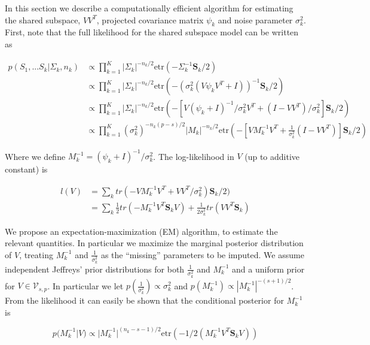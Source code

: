 \documentclass{article}
\newcommand{\etr}{\text{etr}}
\begin{document}
In this section we describe a computationally efficient algorithm for
estimating the shared subspace, $VV^T$, projected covariance matrix
$\psi_k$ and noise parameter $\sigma_k^2$.  First, note that the full
likelihood for the shared subspace model can be written as

\begin{align}
p(S_1, ... S_k | \Sigma_k,n_k) &\propto \prod_{k=1}^K |\Sigma_k|^{-n_k/2}\etr(-\Sigma_k^{-1}\mathbf{S}_k/2)  \\
&\propto \prod_{k=1}^K  |\Sigma_k|^{-n_k/2}\etr(-(\sigma_k^2(V\psi_kV^T +
  I))^{-1}\mathbf{S}_k/2) \\
&\propto \prod_{k=1}^K  |\Sigma_k|^{-n_k/2}\etr(-\left[V(\psi_k +
  I)^{-1}/\sigma_k^2 V^T + (I-VV^T)/\sigma^2_k\right]\mathbf{S}_k/2)
  \\
&\propto \prod_{k=1}^K  (\sigma_k^2)^{-n_k(p-s)/2}|M_k|^{-n_k/2}\etr(-\left[VM_k^{-1}V^T + \frac{1}{\sigma^2_k} (I-VV^T)\right]\mathbf{S}_k/2) 
\end{align}

Where we define $M_k^{-1} = (\psi_k + I) ^{-1}/\sigma_k^2$.  The log-likelihood in
$V$ (up to additive constant) is

\begin{align}
l(V) &= \sum_k tr\left(-VM_k^{-1}V^T +
       VV^T/\sigma^2_k\right)\mathbf{S}_k/2)\\
&= \sum_k \frac{1}{2}tr\left(-M_k^{-1}V^T \mathbf{S}_kV\right) + \frac{1}{2\sigma_k^2}tr\left(VV^T \mathbf{S}_k\right)
\end{align}


We propose an expectation-maximization (EM)
algorithm, to estimate the relevant quantities.  In particular we
maximize the marginal posterior distribution of $V$, treating 
$M_k^{-1}$ and $\frac{1}{\sigma_k^2}$ as the ``missing'' parameters to
be imputed.  We assume independent Jeffreys' prior distributions for
both $\frac{1}{\sigma_k^2}$ and $M_k^{-1}$ and a uniform prior for $V
\in \mathcal{V}_{s, p}$.  In particular we let
$p(\frac{1}{\sigma_k^2}) \propto \sigma_k^2$ and
$p(M_k^{-1}) \propto |M_k^{-1}|^{-(s+1)/2}$.  From the likelihood it
can easily be shown that the conditional posterior for $M_k^{-1}$ is

$$p(M_k^{-1} | V) \propto |M_k^{-1}|^{(n_k - s -1)/2}\etr(-1/2(M_k^{-1}V^T\mathbf{S}_kV)) $$
\end{document}
